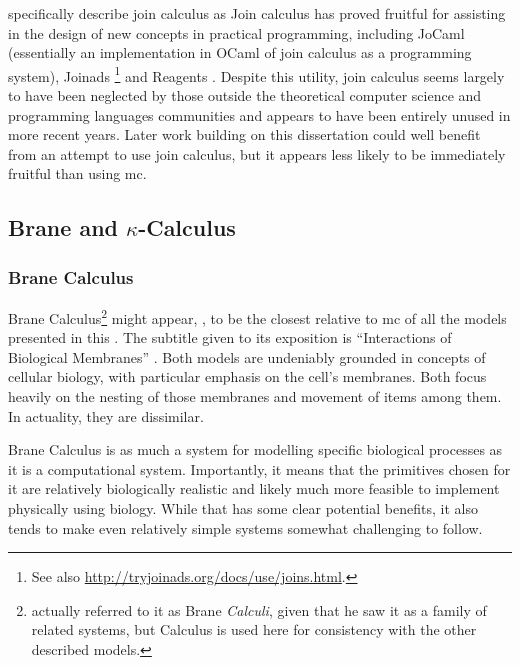 \citeauthor{Fournet2002} specifically describe join calculus as   Join calculus has proved fruitful for assisting in the design of new concepts in practical programming, including JoCaml \cite{Fournet2003} (essentially an implementation in OCaml of join calculus as a programming system), Joinads \cite{Petricek2011}\footnote{See also \url{http://tryjoinads.org/docs/use/joins.html}.} and Reagents \cite{Turon2012}.  Despite this utility, join calculus seems largely to have been neglected by those outside the theoretical computer science and programming languages communities and appears to have been entirely unused in more recent years.  Later work building on this dissertation could well benefit from an attempt to use join calculus, but it appears less likely to be immediately fruitful than using \gls{mc}.

\subsection[Brane and Kappa-Calculus]{Brane and \(\kappa\)-Calculus}
\subsubsection{Brane Calculus}
Brane Calculus\footnote{\citeauthor{Cardelli2005} actually referred to it as Brane \emph{Calculi}, given that he saw it as a family of related systems, but Calculus is used here for consistency with the other described models.} might appear, , to be the closest relative to \gls{mc} of all the models presented in this .  The subtitle given to its exposition is \enquote{Interactions of Biological Membranes} \cite{Cardelli2005}.  Both models are undeniably grounded in concepts of cellular biology, with particular emphasis on the cell's membranes.  Both focus heavily on the nesting of those membranes and movement of items among them.  In actuality, they are dissimilar.

Brane Calculus is as much a system for modelling specific biological processes as it is a computational system.  Importantly, it means that the primitives chosen for it are relatively biologically realistic and likely much more feasible to implement physically using biology.  While that has some clear potential benefits, it also tends to make even relatively simple systems somewhat challenging to follow.

